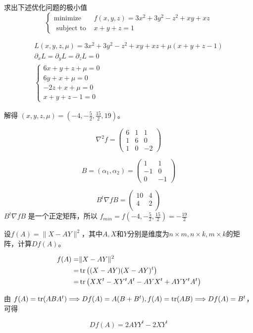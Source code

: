 \begin{problem}
	求出下述优化问题的极小值$$\left\{\begin{array}{ll}
		\operatorname{minimize} & f(x, y, z)=3 x^{2}+3 y^{2}-z^{2}+x y+x z \\
		\text { subject to } & x+y+z=1
	\end{array}\right.$$
\end{problem}
\begin{solution}
	$$\begin{array}{c}
		L(x, y, z, \mu) = 3x^2 + 3y^2 - z^2 + xy + xz + \mu(x + y + z - 1)\\
		\partial_xL = \partial_yL = \partial_zL = 0\\
		\begin{cases}
			6x + y + z + \mu = 0\\
			6y + x + \mu = 0\\
			-2z + x + \mu = 0\\
			x + y + z - 1 = 0
		\end{cases}
	\end{array}$$
	
	解得 $(x, y, z, \mu) = (-4, -\frac{5}{2}, \frac{15}{2}, 19)$。

	$$\nabla^2 f = \begin{pmatrix}
		6 & 1 & 1 \\
		1 & 6 & 0 \\
		1 & 0 & -2
	\end{pmatrix}$$

	$$B = (\alpha_1, \alpha_2) = \begin{pmatrix}
		1 & 1 \\
		-1 & 0 \\ 
		0 & -1
	\end{pmatrix}$$

	$$B^t\nabla f B = \begin{pmatrix}
		 10 & 4 \\ 
		 4 & 2 \\
	\end{pmatrix}$$
	$B^t\nabla f B$ 是一个正定矩阵，所以 $f_{min} = f(-4, -\frac{5}{2}, \frac{15}{2}) =  -\frac{19}{2}$
\end{solution}


\begin{problem}
	设$f(A)=\|X-AY\|^2$，其中$A,X$和$Y$分别是维度为$n\times m,n\times k,m\times k$的矩阵，计算$Df(A)$。
\end{problem}
\begin{solution}
	$$\begin{aligned}
		f(A) =& \|X - AY\|^2 \\
		=& \operatorname{tr}\left((X - AY)(X - AY)^t\right) \\
		=& \operatorname{tr}\left(XX^t - XY^tA^t - AYX^t + AYY^tA^t\right)
	\end{aligned}$$

	由 $f(A) = \operatorname{tr}(ABA^t) \Longrightarrow Df(A) = A(B + B^t), f(A) = \operatorname{tr}(AB) \Longrightarrow Df(A) = B^t$，可得 
	
	$$Df(A) = 2AYY^t - 2XY^t$$
\end{solution}


